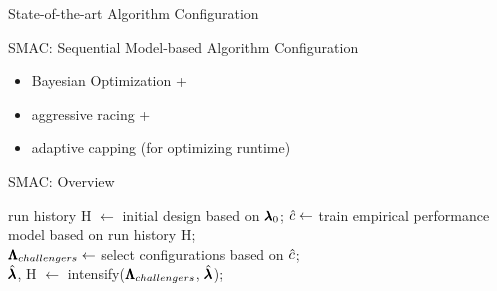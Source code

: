 \begin{frame}[c]{State-of-the-art Algorithm Configuration}

SMAC: Sequential Model-based Algorithm Configuration 

\begin{itemize}
	\item Bayesian Optimization +
	\item aggressive racing +
	\item adaptive capping (for optimizing runtime)
\end{itemize}

\end{frame}
\begin{frame}[c]{SMAC: Overview }

\LinesNotNumbered
\begin{algorithm}[H]
\BlankLine
run history H $\leftarrow$ initial design based on $\pmb{\lambda}_0$; 
 {
	\pause
	$\hat{c} \leftarrow$ train empirical performance model based on run history H;\\
	\pause
	$\pmb{\Lambda}_{challengers} \leftarrow$ select configurations based on $\hat{c}$;\\
	\pause
	$\hat{\conf}$, H $\leftarrow$ intensify($\pmb{\Lambda}_{challengers}$, $\hat{\conf}$); 
}
\pause
\Return{$\hat{\conf}$}
\caption{SMAC}
\end{algorithm}

\end{frame}

